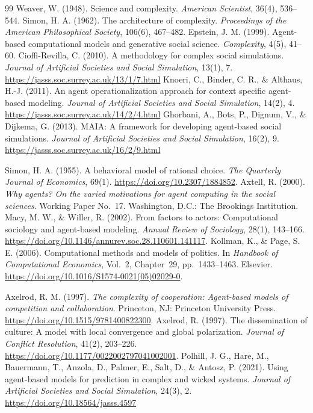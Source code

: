 \documentclass[11pt,a4paper]{article}
\begin{document}
\begingroup\small
\begin{thebibliography}{99}
 Weaver, W. (1948). Science and complexity. \emph{American Scientist}, 36(4), 536--544.
 Simon, H. A. (1962). The architecture of complexity. \emph{Proceedings of the American Philosophical Society}, 106(6), 467--482.
 Epstein, J. M. (1999). Agent-based computational models and generative social science. \emph{Complexity}, 4(5), 41--60.
 Cioffi-Revilla, C. (2010). A methodology for complex social simulations. \emph{Journal of Artificial Societies and Social Simulation}, 13(1), 7. \url{https://jasss.soc.surrey.ac.uk/13/1/7.html}
 Knoeri, C., Binder, C. R., \& Althaus, H.-J. (2011). An agent operationalization approach for context specific agent-based modeling. \emph{Journal of Artificial Societies and Social Simulation}, 14(2), 4. \url{https://jasss.soc.surrey.ac.uk/14/2/4.html}
 Ghorbani, A., Bots, P., Dignum, V., \& Dijkema, G. (2013). MAIA: A framework for developing agent-based social simulations. \emph{Journal of Artificial Societies and Social Simulation}, 16(2), 9. \url{https://jasss.soc.surrey.ac.uk/16/2/9.html}

 Simon, H. A. (1955). A behavioral model of rational choice. \emph{The Quarterly Journal of Economics}, 69(1). \url{https://doi.org/10.2307/1884852}.
 Axtell, R. (2000). \emph{Why agents? On the varied motivations for agent computing in the social sciences}. Working Paper No.~17. Washington, D.C.: The Brookings Institution.
 Macy, M. W., \& Willer, R. (2002). From factors to actors: Computational sociology and agent-based modeling. \emph{Annual Review of Sociology}, 28(1), 143--166. \url{https://doi.org/10.1146/annurev.soc.28.110601.141117}.
 Kollman, K., \& Page, S. E. (2006). Computational methods and models of politics. In \emph{Handbook of Computational Economics}, Vol.~2, Chapter~29, pp.~1433--1463. Elsevier. \url{https://doi.org/10.1016/S1574-0021(05)02029-0}.

 Axelrod, R. M. (1997). \emph{The complexity of cooperation: Agent-based models of competition and collaboration}. Princeton, NJ: Princeton University Press. \url{https://doi.org/10.1515/9781400822300}.
 Axelrod, R. (1997). The dissemination of culture: A model with local convergence and global polarization. \emph{Journal of Conflict Resolution}, 41(2), 203--226. \url{https://doi.org/10.1177/0022002797041002001}.
 Polhill, J. G., Hare, M., Bauermann, T., Anzola, D., Palmer, E., Salt, D., \& Antosz, P. (2021). Using agent-based models for prediction in complex and wicked systems. \emph{Journal of Artificial Societies and Social Simulation}, 24(3), 2. \url{https://doi.org/10.18564/jasss.4597}
\end{thebibliography}
\endgroup
\end{document}
